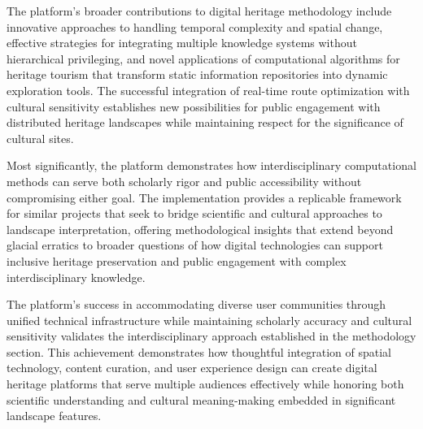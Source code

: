 The platform's broader contributions to digital heritage methodology include innovative approaches to handling temporal complexity and spatial change, effective strategies for integrating multiple knowledge systems without hierarchical privileging, and novel applications of computational algorithms for heritage tourism that transform static information repositories into dynamic exploration tools. The successful integration of real-time route optimization with cultural sensitivity establishes new possibilities for public engagement with distributed heritage landscapes while maintaining respect for the significance of cultural sites.

Most significantly, the platform demonstrates how interdisciplinary computational methods can serve both scholarly rigor and public accessibility without compromising either goal. The implementation provides a replicable framework for similar projects that seek to bridge scientific and cultural approaches to landscape interpretation, offering methodological insights that extend beyond glacial erratics to broader questions of how digital technologies can support inclusive heritage preservation and public engagement with complex interdisciplinary knowledge.

The platform's success in accommodating diverse user communities through unified technical infrastructure while maintaining scholarly accuracy and cultural sensitivity validates the interdisciplinary approach established in the methodology section. This achievement demonstrates how thoughtful integration of spatial technology, content curation, and user experience design can create digital heritage platforms that serve multiple audiences effectively while honoring both scientific understanding and cultural meaning-making embedded in significant landscape features.

